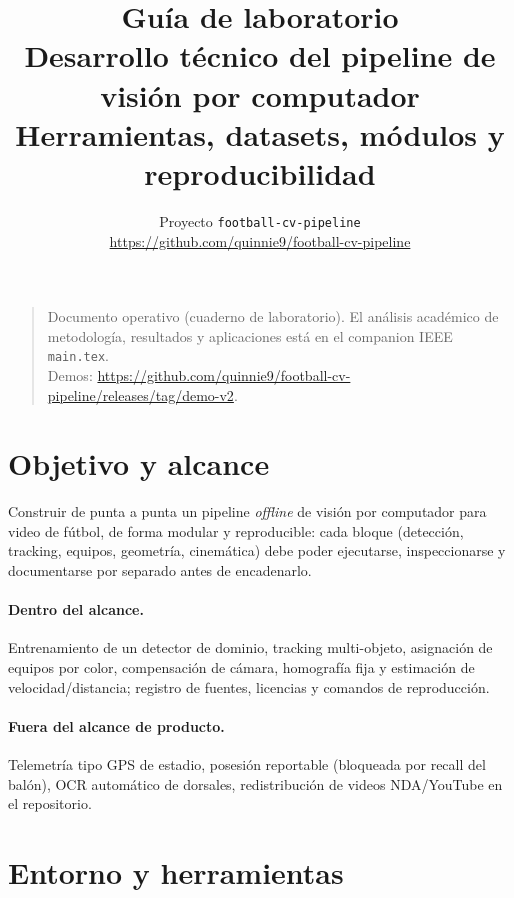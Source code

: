 \documentclass[11pt,a4paper]{article}
\title{\textbf{Guía de laboratorio}\\[0.35em]
\large Desarrollo técnico del pipeline de visión por computador\\
\large Herramientas, datasets, módulos y reproducibilidad}
\author{Proyecto \texttt{football-cv-pipeline}\\
\url{https://github.com/quinnie9/football-cv-pipeline}}
\date{}
\begin{document}
\maketitle
\vspace{-1.2em}

\begin{quote}
\small
Documento operativo (cuaderno de laboratorio). El análisis académico de metodología,
resultados y aplicaciones está en el companion IEEE \texttt{main.tex}.\\
Demos: \url{https://github.com/quinnie9/football-cv-pipeline/releases/tag/demo-v2}.
\end{quote}

\tableofcontents
\vspace{1em}

\section{Objetivo y alcance}
\label{sec:obj}

Construir de punta a punta un pipeline \emph{offline} de visión por computador para video de fútbol, de forma modular y reproducible: cada bloque (detección, tracking, equipos, geometría, cinemática) debe poder ejecutarse, inspeccionarse y documentarse por separado antes de encadenarlo.

\paragraph{Dentro del alcance.}
Entrenamiento de un detector de dominio, tracking multi-objeto, asignación de equipos por color, compensación de cámara, homografía fija y estimación de velocidad/distancia; registro de fuentes, licencias y comandos de reproducción.

\paragraph{Fuera del alcance de producto.}
Telemetría tipo GPS de estadio, posesión reportable (bloqueada por recall del balón), OCR automático de dorsales, redistribución de videos NDA/YouTube en el repositorio.

\section{Entorno y herramientas}
\label{sec:stack}
\end{document}
